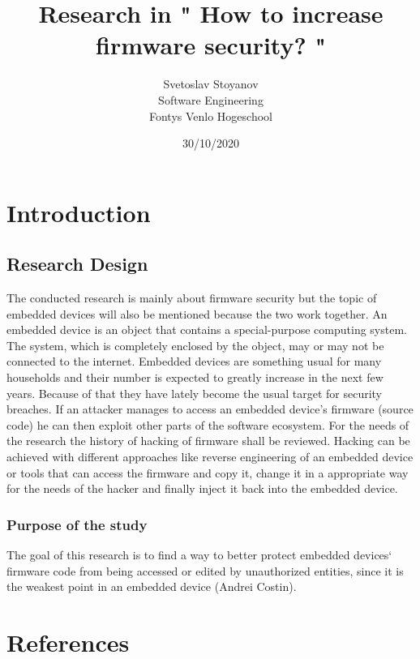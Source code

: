 \documentclass[]{report}
\begin{document}
\title{Research in " How to increase firmware security? " }
\author{Svetoslav Stoyanov \\
	Software Engineering \\
	Fontys Venlo Hogeschool}
\date {30/10/2020}
\maketitle

\tableofcontents
\chapter{Introduction}
\section{Research Design}
The conducted research is mainly about firmware security but the topic of embedded devices will also be mentioned because the two work together. An embedded device is an object that contains a special-purpose computing system. The system, which is completely enclosed by the object, may or may not be connected to the internet.
Embedded devices are something usual for many households and their number is expected to greatly increase in the next few years. Because of that they have lately become the usual target for security breaches. If an attacker manages to access an embedded device's firmware (source code) he can then exploit other parts of the software ecosystem. For the needs of the research the history of hacking of firmware shall be reviewed. Hacking can be achieved with different approaches like reverse engineering of an embedded device or tools that can access the firmware and copy it, change it in a appropriate way for the needs of the hacker and finally inject it back into the embedded device.

\subsection{Purpose of the study} 
The goal of this research is to find a way to better protect embedded devices` firmware code from being accessed or edited by unauthorized entities, since it is the weakest point in an embedded device (Andrei Costin).
\chapter{References}
\end{document}
